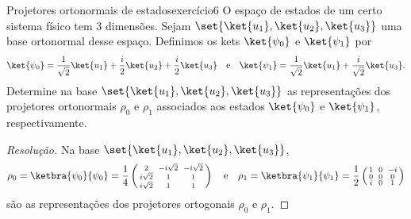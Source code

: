 \begin{exercício}{Projetores ortonormais de estados}{exercício6}
    O espaço de estados de um certo sistema físico tem 3 dimensões. Sejam \(\set{\ket{u_1}, \ket{u_2}, \ket{u_3}}\) uma base ortonormal desse espaço. Definimos os kets \(\ket{\psi_0}\) e \(\ket{\psi_1}\) por
    \begin{equation*}
        \ket{\psi_0} = \frac{1}{\sqrt{2}} \ket{u_1} +\frac{i}{2} \ket{u_2} + \frac{i}{2}\ket{u_3}
        \quad\text{e}\quad
        \ket{\psi_1} = \frac{1}{\sqrt{2}} \ket{u_1} + \frac{i}{\sqrt{2}}\ket{u_3}.
    \end{equation*}
    Determine na base \(\set{\ket{u_1}, \ket{u_2}, \ket{u_3}}\) as representações dos projetores ortonormais \(\rho_0\) e \(\rho_1\) associados aos estados \(\ket{\psi_0}\) e \(\ket{\psi_1}\), respectivamente.
\end{exercício}
\begin{proof}[Resolução]
    Na base \(\set{\ket{u_1}, \ket{u_2}, \ket{u_3}}\),
    \begin{equation*}
        \rho_0 = \ketbra{\psi_0}{\psi_0} = \frac14\left(\begin{smallmatrix}
                2 && -i\sqrt{2} && -i\sqrt{2}\\
                i\sqrt{2} && 1 && 1\\
                i\sqrt{2} && 1 && 1
        \end{smallmatrix}\right)
        \quad\text{e}\quad
        \rho_1 = \ketbra{\psi_1}{\psi_1} = \frac12\left(\begin{smallmatrix}
                1 && 0 && -i\\
                0 && 0 && 0\\
                i && 0 && 1
        \end{smallmatrix}\right)
    \end{equation*}
    são as representações dos projetores ortogonais \(\rho_0\) e \(\rho_1\).
\end{proof}
